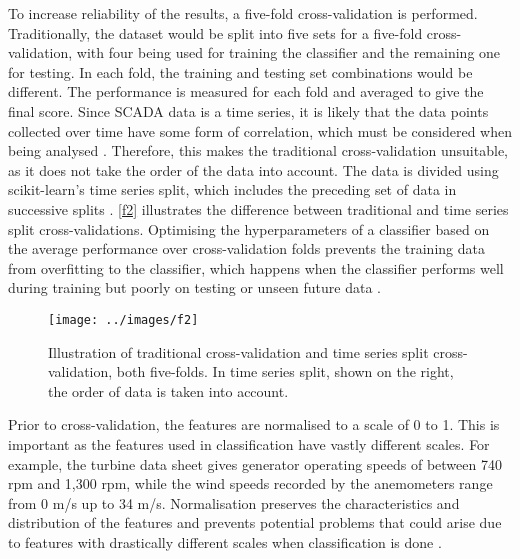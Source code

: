To increase reliability of the results, a five-fold cross-validation is performed. Traditionally, the dataset would be split into five sets for a five-fold cross-validation, with four being used for training the classifier and the remaining one for testing. In each fold, the training and testing set combinations would be different. The performance is measured for each fold and averaged to give the final score. Since SCADA data is a time series, it is likely that the data points collected over time have some form of correlation, which must be considered when being analysed \cite{64I}. Therefore, this makes the traditional cross-validation unsuitable, as it does not take the order of the data into account. The data is divided using scikit-learn's time series split, which includes the preceding set of data in successive splits \cite{31C}. \autoref{f2} illustrates the difference between traditional and time series split cross-validations. Optimising the hyperparameters of a classifier based on the average performance over cross-validation folds prevents the training data from overfitting to the classifier, which happens when the classifier performs well during training but poorly on testing or unseen future data \cite{Puget16,Liang16}.

\begin{figure}
  \centering
  \texttt{[image: ../images/f2]}
  \caption{\label{f2}Illustration of traditional cross-validation and time series split cross-validation, both five-folds. In time series split, shown on the right, the order of data is taken into account.}
\end{figure}

Prior to cross-validation, the features are normalised \cite{43P} to a scale of 0 to 1. This is important as the features used in classification have vastly different scales. For example, the turbine data sheet gives generator operating speeds of between 740 rpm and 1,300 rpm, while the wind speeds recorded by the anemometers range from 0 m/s up to 34 m/s. Normalisation preserves the characteristics and distribution of the features and prevents potential problems that could arise due to features with drastically different scales when classification is done \cite{Norma17}.

